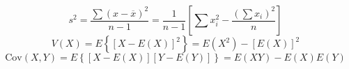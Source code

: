 \begin{tcolorbox}[sharp corners, colback=white,boxrule=1mm]
	\[s^2 = \frac{\sum (x - \overline{x})^2}{n-1} = \frac{1}{n-1}  \left [ \sum x^2_i - \frac{(\sum x_i)^2}{n} \right ]\]
	\[V(X) = E\left \{ [X - E(X)]^2 \right \} = E(X^2) - [E(X)]^2\]
	\[\mathrm{Cov}(X,Y) = E\left \{ [X - E(X)][Y - E(Y)] \right \} = E(XY) - E(X)E(Y)\]
\end{tcolorbox}